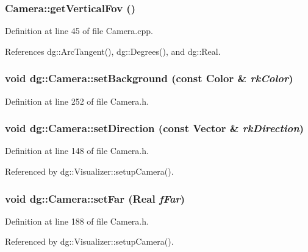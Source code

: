 \subsubsection{ Camera::get\-Vertical\-Fov ()\hspace{0.3cm}{\tt  [inline]}}\label{classdg_1_1Camera_a22}




Definition at line 45 of file Camera.cpp.

References dg::Arc\-Tangent(), dg::Degrees(), and dg::Real.
\subsubsection{\setlength{\rightskip}{0pt plus 5cm}void dg::Camera::set\-Background (const {\bf Color} \& {\em rk\-Color})\hspace{0.3cm}{\tt  [inline]}}\label{classdg_1_1Camera_a23}




Definition at line 252 of file Camera.h.
\subsubsection{\setlength{\rightskip}{0pt plus 5cm}void dg::Camera::set\-Direction (const {\bf Vector} \& {\em rk\-Direction})\hspace{0.3cm}{\tt  [inline]}}\label{classdg_1_1Camera_a6}




Definition at line 148 of file Camera.h.

Referenced by dg::Visualizer::setup\-Camera().
\subsubsection{\setlength{\rightskip}{0pt plus 5cm}void dg::Camera::set\-Far ({\bf Real} {\em f\-Far})\hspace{0.3cm}{\tt  [inline]}}\label{classdg_1_1Camera_a13}




Definition at line 188 of file Camera.h.

Referenced by dg::Visualizer::setup\-Camera().
